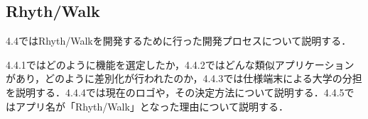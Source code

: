 \subsection{Rhyth/Walk}
\par
4.4ではRhyth/Walkを開発するために行った開発プロセスについて説明する．\par
4.4.1ではどのように機能を選定したか，4.4.2ではどんな類似アプリケーションがあり，どのように差別化が行われたのか，4.4.3では仕様端末による大学の分担を説明する．4.4.4では現在のロゴや，その決定方法について説明する．4.4.5ではアプリ名が「Rhyth/Walk」となった理由について説明する．\par
{}

